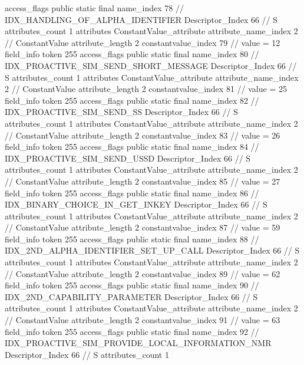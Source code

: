 {{{{{				access_flags	public static final
				name_index	78		// IDX_HANDLING_OF_ALPHA_IDENTIFIER
				Descriptor_Index	66		// S
				attributes_count	1
				attributes {
				ConstantValue_attribute {
					attribute_name_index	2		// ConstantValue
					attribute_length	2
					constantvalue_index	79		// value = 12
				}
				}
			}
			field_info {
				token	255
				access_flags	public static final
				name_index	80		// IDX_PROACTIVE_SIM_SEND_SHORT_MESSAGE
				Descriptor_Index	66		// S
				attributes_count	1
				attributes {
				ConstantValue_attribute {
					attribute_name_index	2		// ConstantValue
					attribute_length	2
					constantvalue_index	81		// value = 25
				}
				}
			}
			field_info {
				token	255
				access_flags	public static final
				name_index	82		// IDX_PROACTIVE_SIM_SEND_SS
				Descriptor_Index	66		// S
				attributes_count	1
				attributes {
				ConstantValue_attribute {
					attribute_name_index	2		// ConstantValue
					attribute_length	2
					constantvalue_index	83		// value = 26
				}
				}
			}
			field_info {
				token	255
				access_flags	public static final
				name_index	84		// IDX_PROACTIVE_SIM_SEND_USSD
				Descriptor_Index	66		// S
				attributes_count	1
				attributes {
				ConstantValue_attribute {
					attribute_name_index	2		// ConstantValue
					attribute_length	2
					constantvalue_index	85		// value = 27
				}
				}
			}
			field_info {
				token	255
				access_flags	public static final
				name_index	86		// IDX_BINARY_CHOICE_IN_GET_INKEY
				Descriptor_Index	66		// S
				attributes_count	1
				attributes {
				ConstantValue_attribute {
					attribute_name_index	2		// ConstantValue
					attribute_length	2
					constantvalue_index	87		// value = 59
				}
				}
			}
			field_info {
				token	255
				access_flags	public static final
				name_index	88		// IDX_2ND_ALPHA_IDENTIFIER_SET_UP_CALL
				Descriptor_Index	66		// S
				attributes_count	1
				attributes {
				ConstantValue_attribute {
					attribute_name_index	2		// ConstantValue
					attribute_length	2
					constantvalue_index	89		// value = 62
				}
				}
			}
			field_info {
				token	255
				access_flags	public static final
				name_index	90		// IDX_2ND_CAPABILITY_PARAMETER
				Descriptor_Index	66		// S
				attributes_count	1
				attributes {
				ConstantValue_attribute {
					attribute_name_index	2		// ConstantValue
					attribute_length	2
					constantvalue_index	91		// value = 63
				}
				}
			}
			field_info {
				token	255
				access_flags	public static final
				name_index	92		// IDX_PROACTIVE_SIM_PROVIDE_LOCAL_INFORMATION_NMR
				Descriptor_Index	66		// S
				attributes_count	1
}}}}}
